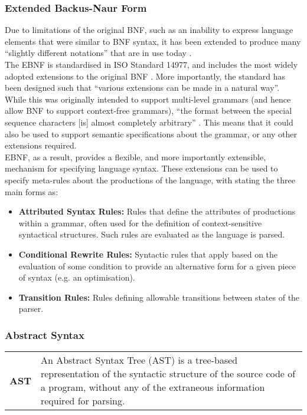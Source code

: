 \documentclass[a4paper,11pt]{report}
\newcommand{\defblock}[3]{
    \begin{longtable}{l p{#1}} 
        \textbf{#2} & #3
    \end{longtable}
}
\begin{document}

\subsubsection{Extended Backus-Naur Form} %
\label{ssub:extended_backus_naur_form}
Due to limitations of the original BNF, such as an inability to express language elements that were similar to BNF syntax, it has been extended to produce many ``slightly different notations'' that are in use today \citep{standard1996ebnf}.\\

The EBNF is standardised in ISO Standard 14977, and includes the most widely adopted extensions to the original BNF \citep{standard1996ebnf}.
More importantly, the standard has been designed such that ``various extensions can be made in a natural way''.
While this was originally intended to support multi-level grammars (and hence allow BNF to support context-free grammars), ``the format between the special sequence characters [is] almost completely arbitrary'' \citep[pg. vii]{standard1996ebnf}.
This means that it could also be used to support semantic specifications about the grammar, or any other extensions required.\\

EBNF, as a result, provides a flexible, and more importantly extensible, mechanism for specifying language syntax.
These extensions can be used to specify meta-rules about the productions of the language, with \citet{slonneger1995formal} stating the three main forms as:
\begin{itemize}
    \item \textbf{Attributed Syntax Rules:} Rules that define the attributes of productions within a grammar, often used for the definition of context-sensitive syntactical structures. 
    Such rules are evaluated as the language is parsed. 
    \item \textbf{Conditional Rewrite Rules:} Syntactic rules that apply based on the evaluation of some condition to provide an alternative form for a given piece of syntax (e.g. an optimisation). 
    \item \textbf{Transition Rules:} Rules defining allowable transitions between states of the parser. 
\end{itemize}


\subsubsection{Abstract Syntax} %
\label{ssub:abstract_syntax}
\defblock{12cm}{AST}{
    An Abstract Syntax Tree (AST) is a tree-based representation of the syntactic structure of the source code of a program, without any of the extraneous information required for parsing.
}
\end{document}
